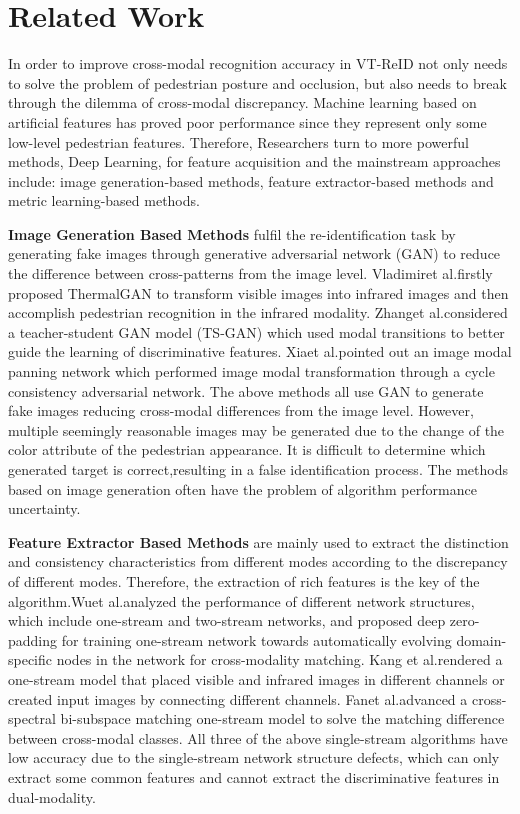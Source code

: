 \documentclass[journal]{IEEEtran}
\begin{document}
\section{Related Work}
	In order to improve cross-modal recognition accuracy in VT-ReID not only needs to solve the problem of pedestrian posture and occlusion, but also needs to break through the dilemma of cross-modal discrepancy. Machine learning based on artificial features has proved poor performance since they represent only some low-level pedestrian features. Therefore, Researchers turn to more powerful methods, Deep Learning, for feature acquisition and the mainstream approaches include: image generation-based methods, feature extractor-based methods and metric learning-based methods.
	
	\textbf{Image Generation Based Methods} fulfil the re-identification task by generating fake images through generative adversarial network (GAN) to reduce the difference between cross-patterns from the image level. Vladimir\textsuperscript{\cite{kniaz2018thermalgan}}et al.firstly proposed ThermalGAN to transform visible images into infrared images and then accomplish pedestrian recognition in the infrared modality. Zhang\textsuperscript{\cite{zhang2021rgb}}et al.considered a teacher-student GAN model (TS-GAN) which used modal transitions to better guide the learning of discriminative features. Xia\textsuperscript{\cite{xia2021visible}}et al.pointed out an image modal panning network which performed image modal transformation through a cycle consistency adversarial network. The above methods all use GAN to generate fake images reducing cross-modal differences from the image level. However, multiple seemingly reasonable images may be generated due to the change of the color attribute of the pedestrian appearance. It is difficult to determine which generated target is correct,resulting in a false identification process. The methods based on image generation often have the problem of algorithm performance uncertainty.  
	
	\textbf{Feature Extractor Based Methods} are mainly used to extract the distinction and consistency characteristics from different modes according to the discrepancy of different modes. Therefore, the extraction of rich features is the key of the algorithm.Wu\textsuperscript{\cite{wu2017rgb}}et al.analyzed the performance of different network structures, which include one-stream and two-stream networks, and proposed deep zero-padding for training one-stream network towards automatically evolving domain-specific nodes in the network for cross-modality matching. Kang\textsuperscript{\cite{kang2019person}} et al.rendered a one-stream model that placed visible and infrared images in different channels or created input images by connecting different channels. Fan\textsuperscript{\cite{fan2020cross}}et al.advanced a cross-spectral bi-subspace matching one-stream model to solve the matching difference between cross-modal classes. All three of the above single-stream algorithms have low accuracy due to the single-stream network structure defects, which can only extract some common features and cannot extract the discriminative features in dual-modality. 
	
\end{document}
